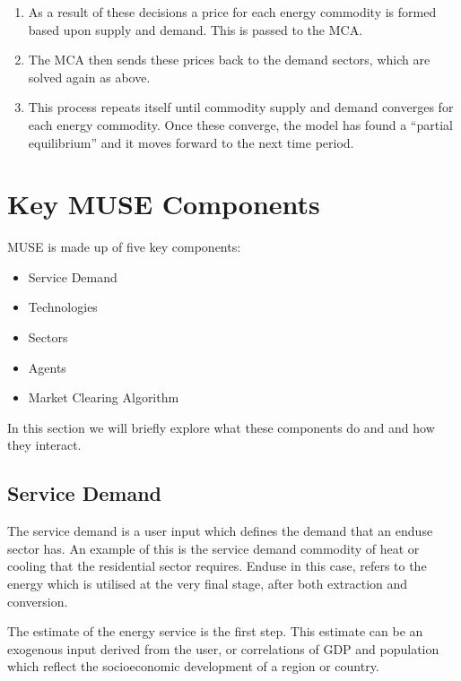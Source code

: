 \documentclass[letterpaper,10pt,english]{sphinxmanual}
\begin{document}
\begin{enumerate}
\item {} 
As a result of these decisions a price for each energy commodity is formed based upon supply and demand. This is passed to the MCA.

\item {} 
The MCA then sends these prices back to the demand sectors, which are solved again as above.

\item {} 
This process repeats itself until commodity supply and demand converges for each energy commodity. Once these converge, the model has found a “partial equilibrium” and it moves forward to the next time period.

\end{enumerate}


\chapter{Key MUSE Components}
\label{\detokenize{muse-components:key-muse-components}}\label{\detokenize{muse-components::doc}}
MUSE is made up of five key components:
\begin{itemize}
\item {} 
Service Demand

\item {} 
Technologies

\item {} 
Sectors

\item {} 
Agents

\item {} 
Market Clearing Algorithm

\end{itemize}

In this section we will briefly explore what these components do and and how they interact.


\section{Service Demand}
\label{\detokenize{muse-components:service-demand}}
The service demand is a user input which defines the demand that an end\sphinxhyphen{}use sector has. An example of this is the service demand commodity of heat or cooling that the residential sector requires. End\sphinxhyphen{}use in this case, refers to the energy which is utilised at the very final stage, after both extraction and conversion.

The estimate of the energy service is the first step. This estimate can be an exogenous input derived from the user, or correlations of GDP and population which reflect the socio\sphinxhyphen{}economic development of a region or country.
\end{document}
